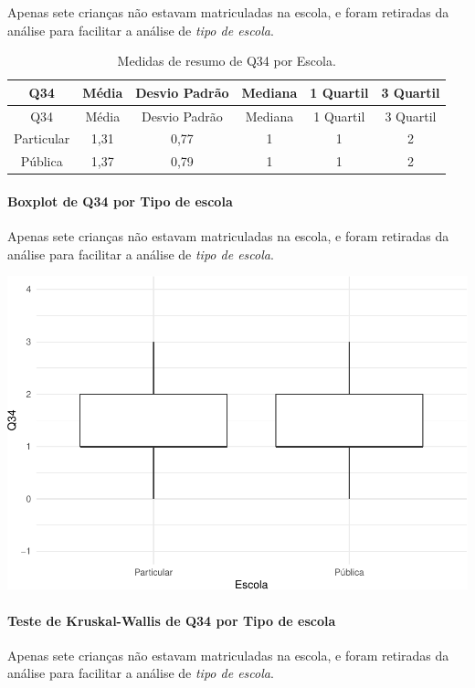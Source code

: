 \documentclass[]{article}
\let\oldparagraph\paragraph
\renewcommand{\paragraph}[1]{\oldparagraph{#1}\mbox{}}
\begin{document}
Apenas sete crianças não estavam matriculadas na escola, e foram retiradas da análise para facilitar a análise de \emph{tipo de escola}.

\begin{longtable}[]{@{}cccccc@{}}
\caption{\label{tab:unnamed-chunk-1236}Medidas de resumo de Q34 por Escola.}\tabularnewline
\toprule
Q34 & Média & Desvio Padrão & Mediana & 1 Quartil & 3 Quartil\tabularnewline
\midrule
\endfirsthead
\toprule
Q34 & Média & Desvio Padrão & Mediana & 1 Quartil & 3 Quartil\tabularnewline
\midrule
\endhead
Particular & 1,31 & 0,77 & 1 & 1 & 2\tabularnewline
Pública & 1,37 & 0,79 & 1 & 1 & 2\tabularnewline
\bottomrule
\end{longtable}

\hypertarget{boxplot-de-q34-por-tipo-de-escola}{%
\paragraph{Boxplot de Q34 por Tipo de escola}\label{boxplot-de-q34-por-tipo-de-escola}}

Apenas sete crianças não estavam matriculadas na escola, e foram retiradas da análise para facilitar a análise de \emph{tipo de escola}.

\begin{center}\includegraphics[width=0.75\linewidth]{relatorio_covid19_files/figure-latex/unnamed-chunk-1237-1} \end{center}

\hypertarget{teste-de-kruskal-wallis-de-q34-por-tipo-de-escola}{%
\paragraph{Teste de Kruskal-Wallis de Q34 por Tipo de escola}\label{teste-de-kruskal-wallis-de-q34-por-tipo-de-escola}}

Apenas sete crianças não estavam matriculadas na escola, e foram retiradas da análise para facilitar a análise de \emph{tipo de escola}.
\end{document}
